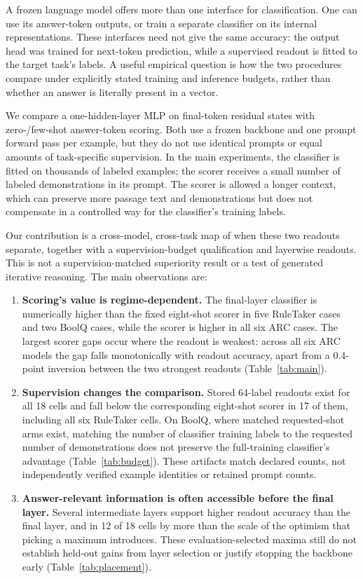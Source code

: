 A frozen language model offers more than one interface for classification.
One can use its answer-token outputs, or train a separate classifier on its
internal representations. These interfaces need not give the same accuracy:
the output head was trained for next-token prediction, while a supervised
readout is fitted to the target task's labels. A useful empirical question is
how the two procedures compare under explicitly stated training and inference
budgets, rather than whether an answer is literally present in a vector.

We compare a one-hidden-layer MLP on final-token residual states with
zero-/few-shot answer-token scoring. Both use a frozen backbone and one prompt
forward pass per example, but they do not use identical prompts or equal
amounts of task-specific supervision. In the main experiments, the classifier
is fitted on thousands of labeled examples; the scorer receives a small
number of labeled demonstrations in its prompt. The scorer is allowed a
longer context, which can preserve more passage text and demonstrations but
does not compensate in a controlled way for the classifier's training labels.

Our contribution is a cross-model, cross-task map of when these two readouts
separate, together with a supervision-budget qualification and layerwise
readouts. This is not a supervision-matched superiority result or a test of
generated iterative reasoning. The main observations are:
\begin{enumerate}
\item \textbf{Scoring's value is regime-dependent.} The final-layer
classifier is numerically higher than the fixed eight-shot scorer in five
RuleTaker cases and two BoolQ cases, while the scorer is higher in all six
ARC cases. The largest scorer gaps occur where the readout is weakest: across
all six ARC models the gap falls monotonically with readout accuracy, apart
from a 0.4-point inversion between the two strongest readouts
(Table~\ref{tab:main}).
\item \textbf{Supervision changes the comparison.} Stored 64-label readouts
exist for all 18 cells and fall below the corresponding eight-shot scorer in
17 of them, including all six RuleTaker cells. On BoolQ, where matched
requested-shot arms exist, matching the number of classifier training labels
to the requested number of demonstrations does not preserve the
full-training classifier's advantage (Table~\ref{tab:budget}). These
artifacts match declared counts, not independently verified example
identities or retained prompt counts.
\item \textbf{Answer-relevant information is often accessible before the
final layer.} Several intermediate layers support higher readout accuracy
than the final layer, and in 12 of 18 cells by more than the scale of the
optimism that picking a maximum introduces. These evaluation-selected maxima
still do not establish held-out gains from layer selection or justify
stopping the backbone early (Table~\ref{tab:placement}).
\end{enumerate}

